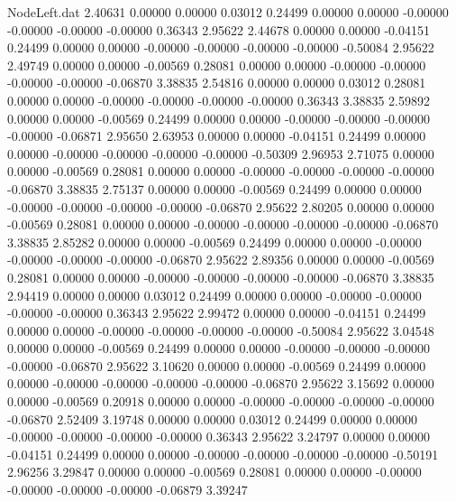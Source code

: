 \begin{filecontents}{NodeLeft.dat}
   2.40631    0.00000    0.00000     0.03012    0.24499    0.00000    0.00000   -0.00000   -0.00000   -0.00000   -0.00000    0.36343    2.95622
   2.44678    0.00000    0.00000    -0.04151    0.24499    0.00000    0.00000   -0.00000   -0.00000   -0.00000   -0.00000   -0.50084    2.95622
   2.49749    0.00000    0.00000    -0.00569    0.28081    0.00000    0.00000   -0.00000   -0.00000   -0.00000   -0.00000   -0.06870    3.38835
   2.54816    0.00000    0.00000     0.03012    0.28081    0.00000    0.00000   -0.00000   -0.00000   -0.00000   -0.00000    0.36343    3.38835
   2.59892    0.00000    0.00000    -0.00569    0.24499    0.00000    0.00000   -0.00000   -0.00000   -0.00000   -0.00000   -0.06871    2.95650
   2.63953    0.00000    0.00000    -0.04151    0.24499    0.00000    0.00000   -0.00000   -0.00000   -0.00000   -0.00000   -0.50309    2.96953
   2.71075    0.00000    0.00000    -0.00569    0.28081    0.00000    0.00000   -0.00000   -0.00000   -0.00000   -0.00000   -0.06870    3.38835
   2.75137    0.00000    0.00000    -0.00569    0.24499    0.00000    0.00000   -0.00000   -0.00000   -0.00000   -0.00000   -0.06870    2.95622
   2.80205    0.00000    0.00000    -0.00569    0.28081    0.00000    0.00000   -0.00000   -0.00000   -0.00000   -0.00000   -0.06870    3.38835
   2.85282    0.00000    0.00000    -0.00569    0.24499    0.00000    0.00000   -0.00000   -0.00000   -0.00000   -0.00000   -0.06870    2.95622
   2.89356    0.00000    0.00000    -0.00569    0.28081    0.00000    0.00000   -0.00000   -0.00000   -0.00000   -0.00000   -0.06870    3.38835
   2.94419    0.00000    0.00000     0.03012    0.24499    0.00000    0.00000   -0.00000   -0.00000   -0.00000   -0.00000    0.36343    2.95622
   2.99472    0.00000    0.00000    -0.04151    0.24499    0.00000    0.00000   -0.00000   -0.00000   -0.00000   -0.00000   -0.50084    2.95622
   3.04548    0.00000    0.00000    -0.00569    0.24499    0.00000    0.00000   -0.00000   -0.00000   -0.00000   -0.00000   -0.06870    2.95622
   3.10620    0.00000    0.00000    -0.00569    0.24499    0.00000    0.00000   -0.00000   -0.00000   -0.00000   -0.00000   -0.06870    2.95622
   3.15692    0.00000    0.00000    -0.00569    0.20918    0.00000    0.00000   -0.00000   -0.00000   -0.00000   -0.00000   -0.06870    2.52409
   3.19748    0.00000    0.00000     0.03012    0.24499    0.00000    0.00000   -0.00000   -0.00000   -0.00000   -0.00000    0.36343    2.95622
   3.24797    0.00000    0.00000    -0.04151    0.24499    0.00000    0.00000   -0.00000   -0.00000   -0.00000   -0.00000   -0.50191    2.96256
   3.29847    0.00000    0.00000    -0.00569    0.28081    0.00000    0.00000   -0.00000   -0.00000   -0.00000   -0.00000   -0.06879    3.39247

\end{filecontents}
